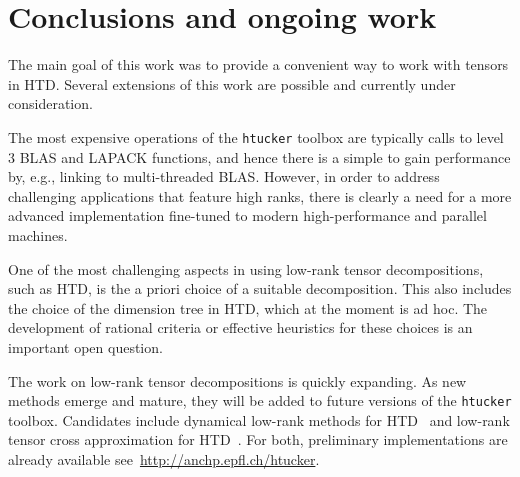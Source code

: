 \documentclass[11pt, a4paper]{article}
\newcommand{\htucker}{{\tt htucker}}
\begin{document}
\section{Conclusions and ongoing work}

The main goal of this work was to provide a convenient way to work with tensors in HTD.
Several extensions of this work are possible and currently under consideration.

The most expensive operations of the \htucker{} toolbox are typically calls to level
$3$ BLAS and LAPACK functions, and hence there is a simple to gain performance by, e.g., linking
to multi-threaded BLAS. However, in order to address challenging
applications that feature high ranks, there is clearly a need
for a more advanced implementation fine-tuned to modern high-performance and
parallel machines.

One of the most challenging aspects in using low-rank tensor decompositions, such as HTD,
is the a priori choice of a suitable decomposition. This also includes the choice of the
dimension tree in HTD, which at the moment is ad hoc. The development of rational criteria or
effective heuristics for these choices is an important open question.

The work on low-rank tensor decompositions is quickly expanding. As new methods emerge
and mature, they will be added to future versions of the \htucker{} toolbox.
Candidates include dynamical low-rank methods for HTD~\cite{Arnold2012,Lubich2012} and 
low-rank tensor cross approximation for HTD~\cite{Ballani2012c,Ballani2012a}. For both, preliminary implementations are already available
see~\url{http://anchp.epfl.ch/htucker}.
\end{document}
